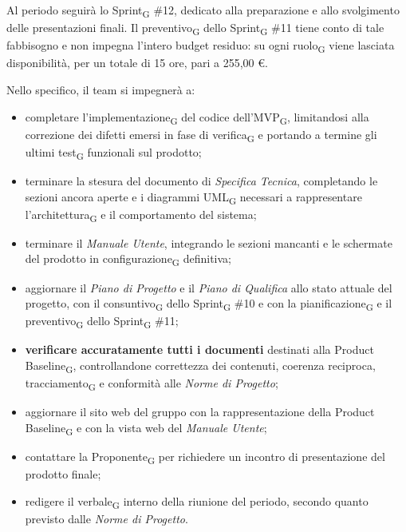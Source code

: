 ﻿\documentclass[a4paper, 10pt, colorlinks=true, linkcolor=black, urlcolor=blue, citecolor=blue, hidelinks]{article}
\begin{document}
Al periodo seguirà lo Sprint\textsubscript{G} \#12, dedicato alla preparazione e allo svolgimento delle presentazioni finali. Il preventivo\textsubscript{G} dello Sprint\textsubscript{G} \#11 tiene conto di tale fabbisogno e non impegna l'intero budget residuo: su ogni ruolo\textsubscript{G} viene lasciata disponibilità, per un totale di 15 ore, pari a 255,00 €.

Nello specifico, il team si impegnerà a:
\begin{itemize}
    \item completare l'implementazione\textsubscript{G} del codice dell'MVP\textsubscript{G}, limitandosi alla correzione dei difetti emersi in fase di verifica\textsubscript{G} e portando a termine gli ultimi test\textsubscript{G} funzionali sul prodotto;

    \item terminare la stesura del documento di \textit{Specifica Tecnica}, completando le sezioni ancora aperte e i diagrammi UML\textsubscript{G} necessari a rappresentare l'architettura\textsubscript{G} e il comportamento del sistema;

    \item terminare il \textit{Manuale Utente}, integrando le sezioni mancanti e le schermate del prodotto in configurazione\textsubscript{G} definitiva;

    \item aggiornare il \textit{Piano di Progetto} e il \textit{Piano di Qualifica} allo stato attuale del progetto, con il consuntivo\textsubscript{G} dello Sprint\textsubscript{G} \#10 e con la pianificazione\textsubscript{G} e il preventivo\textsubscript{G} dello Sprint\textsubscript{G} \#11;

    \item \textbf{verificare accuratamente tutti i documenti} destinati alla Product Baseline\textsubscript{G}, controllandone correttezza dei contenuti, coerenza reciproca, tracciamento\textsubscript{G} e conformità alle \textit{Norme di Progetto};

    \item aggiornare il sito web del gruppo con la rappresentazione della Product Baseline\textsubscript{G} e con la vista web del \textit{Manuale Utente};

    \item contattare la Proponente\textsubscript{G} per richiedere un incontro di presentazione del prodotto finale;

    \item redigere il verbale\textsubscript{G} interno della riunione del periodo, secondo quanto previsto dalle \textit{Norme di Progetto}.
\end{itemize}
\end{document}
